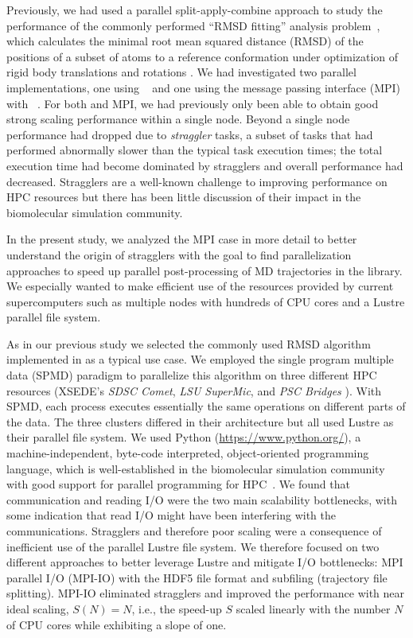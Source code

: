 Previously, we had used a parallel split-apply-combine  approach \cite{Wickham:2011aa} to study the performance of the commonly performed ``RMSD fitting'' analysis problem~\cite{Khoshlessan:2017ab, ICCP-2018, Fan:2019aa}, which calculates the minimal root mean squared distance (RMSD) of the positions of a subset of atoms to a reference conformation under optimization of rigid body translations and rotations \cite{Liu:2010kx, Lea96, Mura:2014kx}.
We had investigated two parallel implementations, one using ~\cite{Rocklin:2015aa} and one using the message passing interface (MPI) with ~\cite{Dalcin:2011aa, Dalcin:2005aa}. 
For both  and MPI, we had previously only been able to obtain good strong scaling performance within a single node.
Beyond a single node performance had dropped due to \emph{straggler} tasks, a subset of tasks that had performed abnormally slower than the typical task execution times; the total execution time had become dominated by stragglers and overall performance had decreased.
Stragglers are a well-known challenge to improving performance on HPC resources \cite{Garraghan2016} but there has been little discussion of their impact in the biomolecular simulation community.

In the present study, we analyzed the MPI case in more detail to better understand the origin of stragglers with the goal to find  parallelization approaches to speed up parallel post-processing of MD trajectories in the  library.
We especially wanted to make efficient use of the resources provided by current supercomputers such as multiple nodes with hundreds of CPU cores and a Lustre parallel file system.

As in our previous study\cite{Khoshlessan:2017ab} we selected the commonly used RMSD algorithm implemented in  as a typical use case.
We employed the single program multiple data (SPMD) paradigm to parallelize this algorithm on three different HPC resources (XSEDE's \emph{SDSC Comet}, \emph{LSU SuperMic}, and \emph{PSC Bridges} \cite{xsede}).
With SPMD, each process executes essentially the same operations on different parts of the data.
The three clusters differed in their architecture but all used Lustre as their parallel file system.
We used Python (\url{https://www.python.org/}), a machine-independent, byte-code interpreted, object-oriented programming language, which is well-established in the biomolecular simulation community with good support for parallel programming for HPC~\cite{Dalcin:2011aa, GAiN}. 
We found that communication and reading I/O were the two main scalability bottlenecks, with some indication that read I/O might have been interfering with the communications.
Stragglers and therefore poor scaling were a consequence of inefficient use of the parallel Lustre file system.
We therefore focused on two different approaches to better leverage Lustre and mitigate I/O bottlenecks: MPI parallel I/O (MPI-IO) with the HDF5 file format and subfiling (trajectory file splitting).
MPI-IO eliminated stragglers and improved the performance with near ideal scaling, $S(N) = N$, i.e., the speed-up $S$ scaled linearly with the number $N$ of CPU cores while exhibiting a slope of one.

